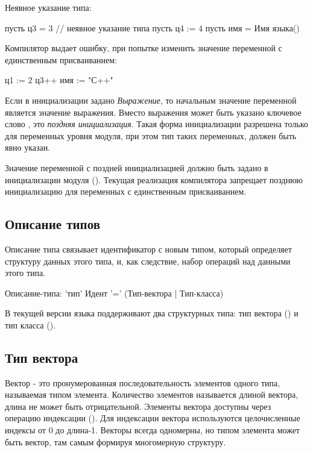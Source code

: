 Неявное указание типа:
\begin{Trivil}[vspace=2pt]
пусть ц3 = 3   // неявное указание типа
пусть ц4 := 4
пусть имя = Имя языка() 
\end{Trivil}

Компилятор выдает ошибку, при попытке изменить значение переменной с единственным присваиванием:
\begin{SampleErr}[vspace=2pt]
    ц1 := 2 
    ц3++
    имя := "С++"
\end{SampleErr}

Если в инициализации задано \emph{Выражение}, то начальным значение переменной является значение выражения.
Вместо выражения может быть указано ключевое слово , это \emph{поздняя инициализация}. 
Такая форма инициализации разрешена только для переменных уровня модуля, при этом тип таких переменных, должен быть явно указан.

Значение переменной с поздней инициализацией должно быть задано в инициализации модуля (). 
Текущая реализация компилятора запрещает позднюю инициализацию для переменных с единственным присваиванием.

\hypertarget{types}{%
\subsection{Описание типов}\label{decls:types}}

Описание типа связывает идентификатор с новым типом, который определяет структуру данных этого типа, и, как следствие, набор операций над данными этого типа.

\begin{Grammar}
Описание-типа: 'тип' Идент '=' (Тип-вектора | Тип-класса)
\end{Grammar} 

В текущей версии языка поддерживают два структурных типа: тип вектора () и тип класса ().

\hypertarget{vector-types}{%
\subsection{Тип вектора}\label{decls:vector-types}}

Вектор - это пронумерованная последовательность элементов одного типа, называемая типом элемента. Количество элементов называется длиной вектора, длина не может быть отрицательной. Элементы вектора доступны через операцию индексации (). Для индексации вектора используются целочисленные индексы  от 0 до длина-1. Векторы всегда одномерны, но типом элемента может быть вектор, там самым формируя многомерную структуру.

